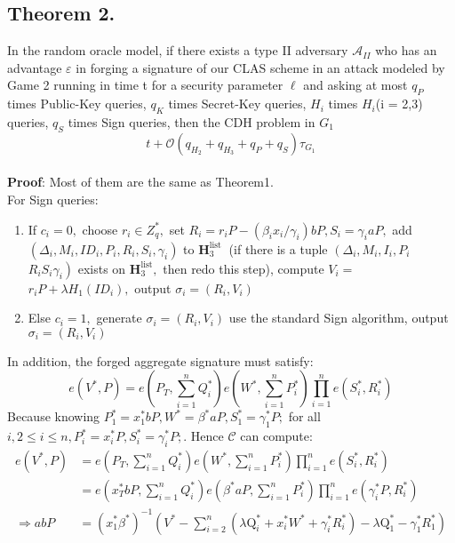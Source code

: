 \documentclass[11pt]{article}
\begin{document}
\subsection{Theorem 2.}
In the random oracle model, if there exists a type II adversary \(\mathcal{A}_{II}\) who has an advantage $\varepsilon$ in forging a signature of our CLAS scheme in an attack modeled by Game 2 running in time t for a security parameter $\ell$ and asking at most $q_P$ times Public-Key queries, $q_K$ times Secret-Key queries, $H_i$ times $H_i$(i = 2,3) queries, $q_S$ times Sign queries, then the CDH problem in $G_1$
\begin{equation}
      t+\mathcal{O}\left(q_{H_{2}}+q_{H_{3}}+q_{P}+q_{S}\right) \tau_{G_{1}}
\end{equation}\\
\textbf{Proof}: Most of them are the same as Theorem1.\\
For Sign queries:
\begin{enumerate}
      \item If \(c_{i}=0,\) choose \(r_{i} \in Z_{q}^{*},\) set \(R_{i}=r_{i} P-\left(\beta_{i} x_{i} / \gamma_{i}\right) b P, S_{i}=\gamma_{i} a P,\) add
      \(\left(\Delta_{i}, M_{i}, I D_{i}, P_{i}, R_{i}, S_{i}, \gamma_{i}\right)\) to \(\mathbf{H}_{3}^{\text {list }}\) (if there is a tuple \(\left(\Delta_{i}, M_{i}, I_{i}, P_{i}\right.\)
      \(\left.R_{i} S_{i} \gamma_{i}\right)\) exists on \(\mathbf{H}_{3}^{\mathrm{list}},\) then redo this step), compute \(V_{i}=\) \(r_{i} P+\lambda H_{1}\left(I D_{i}\right),\) output \(\sigma_{i}=\left(R_{i}, V_{i}\right)\)
      \item Else \(c_{i}=1,\) generate \(\sigma_{i}=\left(R_{i}, V_{i}\right)\) use the standard Sign algorithm, output \(\sigma_{i}=\left(R_{i}, V_{i}\right)\)
\end{enumerate}
In addition, the forged aggregate signature must satisfy:
\begin{equation*}
      e\left(V^{*}, P\right)=e\left(P_{T}, \sum_{i=1}^{n} Q_{i}^{*}\right) e\left(W^{*}, \sum_{i=1}^{n} P_{i}^{*}\right) \prod_{i=1}^{n} e\left(S_{i}^{*}, R_{i}^{*}\right)
\end{equation*}
Because knowing  \(P_{1}^{*}=x_{1}^{*} b P, W^{*}=\beta^{*} a P, S_{1}^{*}=\gamma_{1}^{*} P ;\) for all \(i, 2 \le i \le n, P_{i}^{*}=x_{i}^{*} P, S_{i}^{*}=\gamma_{i}^{*} P ;\). Hence \(\mathcal{C}\) can compute:
\begin{align}
      e\left(V^{*}, P\right)&=e\left(P_{T}, \sum_{i=1}^{n} Q_{i}^{*}\right) e\left(W^{*}, \sum_{i=1}^{n} P_{i}^{*}\right) \prod_{i=1}^{n} e\left(S_{i}^{*}, R_{i}^{*}\right)\\
      &=e\left(x_{T}^{*} b P, \sum_{i=1}^{n} Q_{i}^{*}\right) e\left(\beta^{*} a P, \sum_{i=1}^{n} P_{i}^{*}\right) \prod_{i=1}^{n} e\left(\gamma_{i}^{*} P, R_{i}^{*}\right)\\
      \Rightarrow a b P&=\left(x_{1}^{*} \beta^{*}\right)^{-1}\left(V^{*}-\sum_{i=2}^{n}\left(\lambda \mathrm{Q}_{i}^{*}+x_{i}^{*} W^{*}+\gamma_{i}^{*} R_{i}^{*}\right)-\lambda \mathrm{Q}_{1}^{*}-\gamma_{1}^{*} R_{1}^{*}\right)
\end{align}
\end{document}
